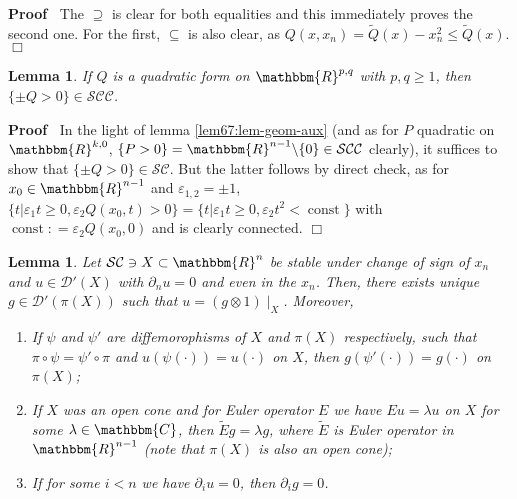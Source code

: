 \documentclass{article}
\newcommand{\tmop}[1]{\ensuremath{\operatorname{#1}}}
\renewenvironment{proof}{\noindent\textbf{Proof\ }}{\hspace*{\fill}$\Box$\medskip}
\newtheorem{lemma}[proposition]{Lemma}
\theoremstyle{remark}
\begin{document}
\begin{proof}
  The $\supseteq$ is clear for both equalities and this immediately proves the
  second one. For the first, $\subseteq$ is also clear, as $Q (x, x_n) =
  \tilde{Q} (x) - x_n^2 \leqslant \tilde{Q} (x)$.
\end{proof}

\begin{lemma}
  \label{lem67:lem-geom}If $Q$ is a quadratic form on $\mathbbm{R}^{p, q}$
  with $p, q \geqslant 1$, then $\{ \pm Q > 0 \} \in
  \mathcal{S}\mathcal{C}\mathcal{C}$.
\end{lemma}

\begin{proof}
  In the light of lemma \ref{lem67:lem-geom-aux} (and as for $P$ quadratic on
  $\mathbbm{R}^{k, 0}$, $\{ P > 0 \} =\mathbbm{R}^{n - 1} \backslash \{ 0 \}
  \in \mathcal{S}\mathcal{C}\mathcal{C}$ clearly), it suffices to show that
  $\{ \pm Q > 0 \} \in \mathcal{S}\mathcal{C}$. But the latter follows by
  direct check, as for $x_0 \in \mathbbm{R}^{n - 1}$ and $\varepsilon_{1, 2} =
  \pm 1$, $\{ t | \varepsilon_1 t \geqslant 0, \varepsilon_2 Q (x_0, t) > 0 \}
  = \{ t | \varepsilon_1 t \geqslant 0, \varepsilon_2 t^2 < \tmop{const} \}$
  with $\tmop{const} : = \varepsilon_2 Q (x_0, 0)$ and is clearly connected.
\end{proof}

\begin{lemma}
  \label{lem67:lem-tensor-aux}Let $\mathcal{S}\mathcal{C} \ni X \subset
  \mathbbm{R}^n$ be stable under change of sign of $x_n$ and $u \in
  \mathcal{D}' (X)$ with $\partial_n u = 0$ and even in the $x_n$. Then, there
  exists unique $g \in \mathcal{D}' (\pi (X))$ such that $u = (g \otimes 1)
  \mid_X$. Moreover,
  \begin{enumerate}
    \item If $\psi$ and $\psi'$ are diffemorophisms of $X$ and $\pi (X)$
    respectively, such that $\pi \circ \psi = \psi' \circ \pi$ and $u (\psi
    (\cdot)) = u (\cdot)$ on $X$, then $g (\psi' (\cdot)) = g (\cdot)$ on $\pi
    (X)$;
    
    \item If $X$ was an open cone and for Euler operator $E$ we have $E u =
    \lambda u$ on $X$ for some $\lambda \in \mathbbm{C}$, then $\tilde{E} g =
    \lambda g$, where $\tilde{E}$ is Euler operator in $\mathbbm{R}^{n - 1}$
    (note that $\pi (X)$ is also an open cone);
    
    \item If for some $i < n$ we have $\partial_i u = 0$, then $\partial_i g =
    0$.
  \end{enumerate}
\end{lemma}
\end{document}
